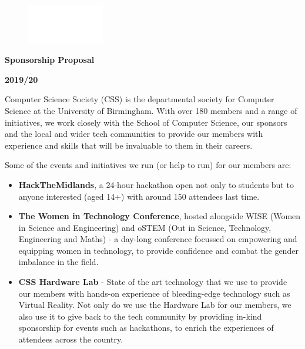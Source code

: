 \documentclass{article}
\begin{document}
\begin{figure}
    \vspace*{-1cm}
    \centering
    \includegraphics[width=0.3\textwidth]{CSS_Logo}
\end{figure}

\vspace*{1cm}

\Huge

\noindent \hspace{0.5cm}\textbf{Sponsorship Proposal}

\par

\noindent \hspace{0.5cm}\textbf{2019/20}

\vspace{1.5cm}

\fontsize{11}{14}\selectfont

Computer Science Society (CSS) is the departmental society for Computer
Science at the University of Birmingham. With over 180 members and a
range of initiatives, we work closely with the School of Computer
Science, our sponsors and the local and wider tech communities to
provide our members with experience and skills that will be invaluable
to them in their careers.

Some of the events and initiatives we run (or help to run) for our
members are:\newline

\begin{itemize}
\item
  \textbf{HackTheMidlands}, a 24-hour hackathon open not only to
  students but to anyone interested (aged 14+) with around 150 attendees
  last time.
\item
  \textbf{The Women in Technology Conference}, hosted alongside WISE
  (Women in Science and Engineering) and oSTEM (Out in Science,
  Technology, Engineering and Maths) - a day-long conference focussed on
  empowering and equipping women in technology, to provide confidence
  and combat the gender imbalance in the field.
\item
  \textbf{CSS Hardware Lab} - State of the art technology that we use to
  provide our members with hands-on experience of bleeding-edge
  technology such as Virtual Reality. Not only do we use the Hardware
  Lab for our members, we also use it to give back to the tech community
  by providing in-kind sponsorship for events such as hackathons, to
  enrich the experiences of attendees across the country.\newline
\end{itemize}
\end{document}
